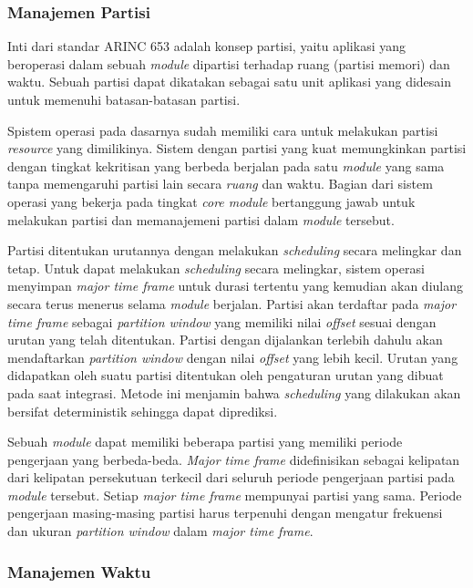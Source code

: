 \subsubsection[Manajemen Partisi]{Manajemen Partisi}

Inti dari standar ARINC 653 adalah konsep partisi, yaitu aplikasi yang beroperasi dalam sebuah
\textit{module} dipartisi terhadap ruang (partisi memori) dan waktu.  Sebuah partisi dapat
dikatakan sebagai satu unit aplikasi yang didesain untuk memenuhi batasan-batasan partisi.

Spistem operasi pada dasarnya sudah memiliki cara untuk melakukan partisi \textit{resource} yang
dimilikinya.  Sistem dengan partisi yang kuat memungkinkan partisi dengan tingkat kekritisan
yang berbeda berjalan pada satu \textit{module} yang sama tanpa memengaruhi partisi lain secara
\textit{ruang} dan waktu.  Bagian dari sistem operasi yang bekerja pada tingkat \textit{core
module} bertanggung jawab untuk melakukan partisi dan memanajemeni partisi dalam \textit{module}
tersebut.

Partisi ditentukan urutannya dengan melakukan \textit{scheduling} secara melingkar dan tetap.
Untuk dapat melakukan \textit{scheduling} secara melingkar, sistem operasi menyimpan
\textit{major time frame} untuk durasi tertentu yang kemudian akan diulang secara terus menerus
selama \textit{module} berjalan.  Partisi akan terdaftar pada \textit{major time frame} sebagai
\textit{partition window} yang memiliki nilai \textit{offset} sesuai dengan urutan yang telah
ditentukan.  Partisi dengan dijalankan terlebih dahulu akan mendaftarkan \textit{partition
window} dengan nilai \textit{offset} yang lebih kecil.  Urutan yang didapatkan oleh suatu
partisi ditentukan oleh pengaturan urutan yang dibuat pada saat integrasi.  Metode ini menjamin
bahwa \textit{scheduling} yang dilakukan akan bersifat deterministik sehingga dapat diprediksi.

Sebuah \textit{module} dapat memiliki beberapa partisi yang memiliki periode pengerjaan yang
berbeda-beda.  \textit{Major time frame} didefinisikan sebagai kelipatan dari kelipatan
persekutuan terkecil dari seluruh periode pengerjaan partisi pada \textit{module} tersebut.
Setiap \textit{major time frame} mempunyai partisi yang sama.  Periode pengerjaan masing-masing
partisi harus terpenuhi dengan mengatur frekuensi dan ukuran \textit{partition window} dalam
\textit{major time frame}.

\subsubsection{Manajemen Waktu}

